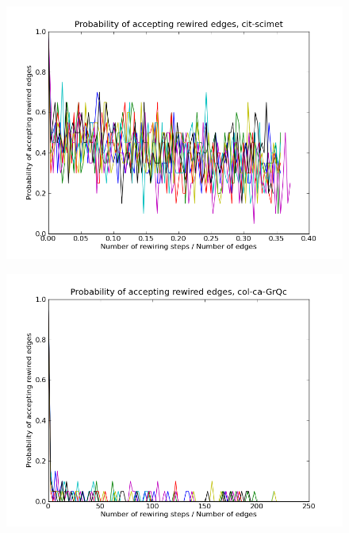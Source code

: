 \documentclass[12pt]{article}
\begin{document}
\begin{figure}[p]
\includegraphics[scale=0.75]{Paccept-cit-scimet.png}\\
\end{figure}


\begin{figure}[p]
\includegraphics[scale=0.75]{Paccept-col-ca-GrQc.png}\\
\end{figure}
\end{document}
